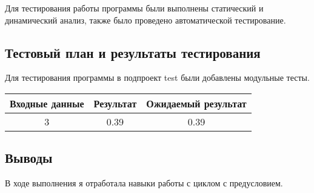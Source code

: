 \documentclass[12pt,a4paper]{report}
\begin{document}
Для тестирования работы программы были выполнены статический и динамический анализ, также было проведено автоматической тестирование.
\subsection{Тестовый план и результаты тестирования}
Для тестирования программы в подпроект test были добавлены модульные тесты. 
 
 
 
 \begin{tabular}{|c|c|c|}
 	\hline 	
 	Входные данные & Результат & Ожидаемый  результат \\
 	\hline
	3 & 0.39 & 0.39 \\
 	\hline
 	
 \end{tabular}

\subsection{Выводы}
В ходе выполнения я отработала навыки работы с циклом с предусловием. 

%

%
\end{document}
